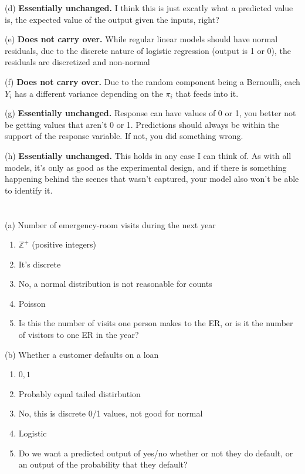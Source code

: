 \documentclass{article}
\begin{document}
(d) \textbf{Essentially unchanged.} I think this is just excatly what a predicted value is, the expected value of the output given the inputs, right?

(e) \textbf{Does not carry over.} While regular linear models should have normal residuals, due to the discrete nature of logistic regression (output is 1 or 0), the residuals are discretized and non-normal

(f) \textbf{Does not carry over.} Due to the random component being a Bernoulli, each $Y_i$ has a different variance depending on the $\pi_i$ that feeds into it. 

(g) \textbf{Essentially unchanged.} Response can have values of 0 or 1, you better not be getting values that aren't 0 or 1. Predictions should always be within the support of the response variable. If not, you did something wrong. 

(h) \textbf{Essentially unchanged.} This holds in any case I can think of. As with all models, it's only as good as the experimental design, and if there is something happening behind the scenes that wasn't captured, your model also won't be able to identify it.



\section{}

(a) Number of emergency-room visits during the next year

\begin{enumerate}
    \item $\mathbb{Z}^{+}$ (positive integers)
    \item It's discrete
    \item No, a normal distribution is not reasonable for counts
    \item Poisson
    \item Is this the number of visits one person makes to the ER, or is it the number of visitors to one ER in the year?
\end{enumerate}

(b) Whether a customer defaults on a loan

\begin{enumerate}
    \item ${0, 1}$
    \item Probably equal tailed distirbution
    \item No, this is discrete 0/1 values, not good for normal
    \item Logistic
    \item Do we want a predicted output of yes/no whether or not they do default, or an output of the probability that they default?
\end{enumerate}
\end{document}
